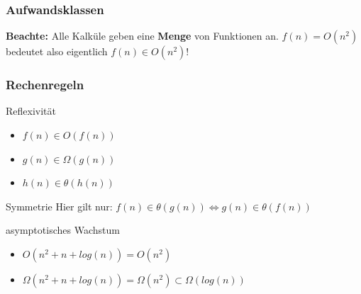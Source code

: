 \begin{frame}
			\frametitle{Aufwandsklassen}
		\begin{block}{\bf Beachte:}
		Alle Kalküle geben eine {\bf Menge} von Funktionen an. $f(n) = O(n^2)$ bedeutet also eigentlich $f(n) \in O(n^2)$!
		\end{block}
\end{frame}


\begin{frame}
			\frametitle{Rechenregeln}
			\begin{block}{Reflexivität}
                \begin{itemize}
                    \item $f(n) \in O(f(n))$
                    \item $g(n) \in \Omega(g(n))$
					\item $h(n) \in \theta(h(n))$
                \end{itemize}
			\end{block}
			\begin{block}{Symmetrie}
					Hier gilt nur:  $f(n) \in \theta(g(n)) \Leftrightarrow g(n) \in \theta(f(n))$
			\end{block}
			\begin{block}{asymptotisches Wachstum}
				\begin{itemize}
                    \item $O(n^2 + n + log(n)) = O(n^2)$
                    \item $\Omega(n^2 + n + log(n)) = \Omega(n^2) \subset \Omega(log(n))$
                \end{itemize}
			\end{block}
\end{frame}

